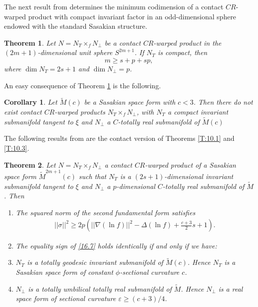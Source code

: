 \documentclass{amsart}
\theoremstyle{plain}
\newtheorem{theorem}{Theorem}[section]
\newtheorem{corollary}{Corollary}[section]
\numberwithin{equation}{section}
\theoremstyle{remark}
\numberwithin{equation}{section}
\begin{document}
The next result from \cite{HM03}  determines the minimum codimension of a contact $CR$-warped product with compact invariant factor in an odd-dimensional sphere endowed with the standard Sasakian structure.

\begin{theorem} \label{T:16.3} Let $N=N_{T}\times_{f} N_{\perp}$ be a contact $CR$-warped product in the
$(2m+1)$-dimensional unit sphere $S^{2m+1}$. If $N_{T}$ is compact, then 
$$m\geq s+p+s p,$$
where $\dim N_{T}=2s+1$ and $\dim N_{\perp}=p$.
\end{theorem}

An easy consequence of Theorem \ref{T:16.3} is the following.

\begin{corollary} Let $\tilde M(c)$ be a Sasakian space form with $c<3$. Then there do not exist contact $CR$-warped products $N_{T}\times_{f} N_{\perp}$, with $N_{T}$ a compact invariant submanifold tangent to $\xi$ and $N_{\perp}$ a $C$-totally real submanifold of $\tilde M(c)$\end{corollary}

The following results from \cite{HM03,Mu05} are the  contact version of Theorems \ref{T:10.1} and \ref{T:10.3}.

\begin{theorem} \label{T:16.4}   Let  $N=N_{T}\times_{f} N_{\perp}$ a contact $CR$-warped product of a Sasakian space form $\tilde M^{2m+1}(c)$ such that $N_{T}$ is a
$(2s+1)$-dimensional invariant submanifold tangent to $\xi$ and $N_{\perp}$ a $p$-dimensional $C$-totally real submanifold of $\tilde M$. Then

\begin{enumerate}
\item The squared norm of the second fundamental form satisfies
\begin{align} \label{16.7} ||\sigma||^{2}\geq 2p \left(||\nabla(\ln f)||^{2}-\Delta(\ln f)+\frac{c+3}{2}s+1\right).\end{align}

\item The equality sign of \eqref{16.7} holds identically if and only if we have:
\item[(2.1)]
  $N_{T}$ is a totally geodesic invariant submanifold of $\tilde M(c)$. Hence $N_{T}$ is a Sasakian space form of constant $\phi$-sectional curvature $c$.
\item[(2.2)] $N_{\perp}$ is a totally umbilical totally real submanifold of $\tilde M$. Hence $N_{\perp}$ is a real space form of sectional curvature $\varepsilon \geq (c+3)/4$.
\end{enumerate} \end{theorem}
\end{document}
